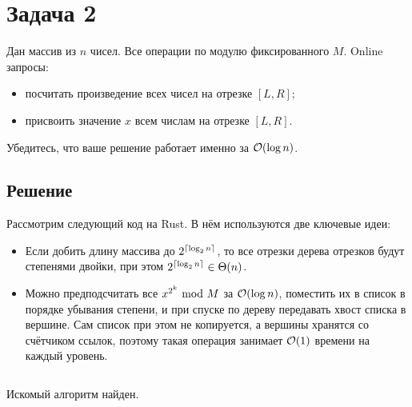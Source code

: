 \section{Задача 2}
Дан массив из $n$ чисел. Все операции по модулю фиксированного $M$.
Online запросы:
\begin{itemize}
    \item посчитать произведение всех чисел на отрезке $[L, R]$;
    \item присвоить значение $x$ всем числам на отрезке $[L, R]$.
\end{itemize}

Убедитесь, что ваше решение работает именно за $\mathcal{O}(\log n)$.

\subsection{Решение}
Рассмотрим следующий код на Rust.
В нём используются две ключевые идеи:
\begin{itemize}
    \item Если добить длину массива до $2^{\left \lceil \log_2 n \right \rceil}$, то все отрезки дерева отрезков будут степенями двойки,
    при этом $2^{\left \lceil \log_2 n \right \rceil} \in \Theta(n)$.
    \item Можно предподсчитать все $x^{2^k} ~\text{mod}~ M$ за $\mathcal{O}(\log n)$,
    поместить их в список в порядке убывания степени,
    и при спуске по дереву передавать хвост списка в вершине.
    Сам список при этом не копируется, а вершины хранятся со счётчиком ссылок,
    поэтому такая операция занимает $\mathcal{O}(1)$ времени на каждый уровень.
\end{itemize}

\inputminted[firstline=5]{rust}{code/src/task02/mod.rs}

Искомый алгоритм найден.
